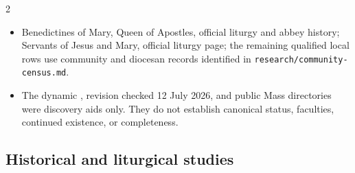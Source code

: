 \begin{multicols}{2}
\begin{itemize}[itemsep=0.12em,topsep=0.15em]
\item Benedictines of Mary, Queen of Apostles, official liturgy and abbey history; Servants of Jesus and Mary, official liturgy page; the remaining qualified local rows use community and diocesan records identified in \texttt{research/community-census.md}.
\item The dynamic , revision checked 12 July 2026, and public Mass directories were discovery aids only. They do not establish canonical status, faculties, continued existence, or completeness.
\end{itemize}

\subsection*{Historical and liturgical studies}


\end{multicols}

